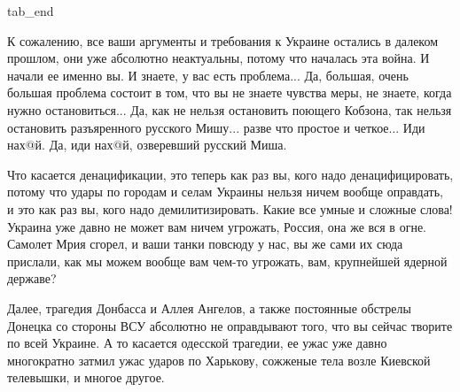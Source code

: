   tab_end
\fi

К сожалению, все ваши аргументы и требования к Украине остались в далеком
прошлом, они уже абсолютно неактуальны, потому что началась эта война. И начали
ее именно вы. И знаете, у вас есть проблема... Да, большая, очень большая
проблема состоит в том, что вы не знаете чувства меры, не знаете, когда нужно
остановиться... Да, как не нельзя остановить поющего Кобзона, так нельзя
остановить разъяренного русского Мишу...  разве что простое и четкое... Иди
нах@й. Да, иди нах@й, озверевший русский Миша.

Что касается денацификации, это теперь как раз вы, кого надо денацифицировать,
потому что удары по городам и селам Украины нельзя ничем вообще оправдать, и
это как раз вы, кого надо демилитизировать. Какие все умные и сложные слова!
Украина уже давно не может вам ничем угрожать, Россия, она же вся в огне.
Самолет Мрия сгорел, и ваши танки повсюду у нас, вы же сами их сюда прислали,
как мы можем вообще вам чем-то угрожать, вам, крупнейшей ядерной державе?

Далее, трагедия Донбасса и Аллея Ангелов, а также постоянные обстрелы Донецка
со стороны ВСУ абсолютно не оправдывают того, что вы сейчас творите по всей
Украине. А то касается одесской трагедии, ее ужас уже давно многократно затмил
ужас ударов по Харькову, сожженые тела возле Киевской телевышки, и многое
другое.
